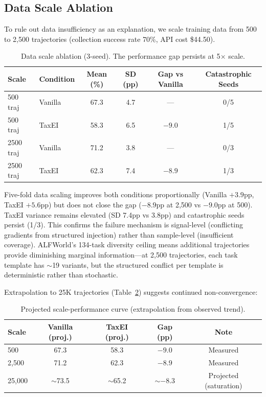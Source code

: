 \documentclass[11pt,a4paper]{article}
\begin{document}
\subsection{Data Scale Ablation}
\label{sec:scale}

To rule out data insufficiency as an explanation, we scale training data from 500 to 2,500 trajectories (collection success rate 70\%, API cost \$44.50).

\begin{table}[h]
\centering
\caption{Data scale ablation (3-seed). The performance gap persists at 5$\times$ scale.}
\label{tab:scale}
\begin{tabular}{llcccc}
\toprule
Scale & Condition & Mean (\%) & SD (pp) & Gap vs Vanilla & Catastrophic Seeds \\
\midrule
500 traj & Vanilla & 67.3 & 4.7 & --- & 0/5 \\
500 traj & TaxEI & 58.3 & 6.5 & $-9.0$ & 1/5 \\
\midrule
2500 traj & Vanilla & 71.2 & 3.8 & --- & 0/3 \\
2500 traj & TaxEI & 62.3 & 7.4 & $-8.9$ & 1/3 \\
\bottomrule
\end{tabular}
\end{table}

Five-fold data scaling improves both conditions proportionally (Vanilla $+3.9$pp, TaxEI $+5.6$pp) but does not close the gap ($-8.9$pp at 2,500 vs $-9.0$pp at 500). TaxEI variance remains elevated (SD 7.4pp vs 3.8pp) and catastrophic seeds persist (1/3). This confirms the failure mechanism is signal-level (conflicting gradients from structured injection) rather than sample-level (insufficient coverage). ALFWorld's 134-task diversity ceiling means additional trajectories provide diminishing marginal information---at 2,500 trajectories, each task template has $\sim$19 variants, but the structured conflict per template is deterministic rather than stochastic.

Extrapolation to 25K trajectories (Table~\ref{tab:scaleproj}) suggests continued non-convergence:

\begin{table}[h]
\centering
\caption{Projected scale-performance curve (extrapolation from observed trend).}
\label{tab:scaleproj}
\begin{tabular}{lcccc}
\toprule
Scale & Vanilla (proj.) & TaxEI (proj.) & Gap (pp) & Note \\
\midrule
500 & 67.3 & 58.3 & $-9.0$ & Measured \\
2,500 & 71.2 & 62.3 & $-8.9$ & Measured \\
25,000 & $\sim$73.5 & $\sim$65.2 & $\sim -8.3$ & Projected (saturation) \\
\bottomrule
\end{tabular}
\end{table}
\end{document}
